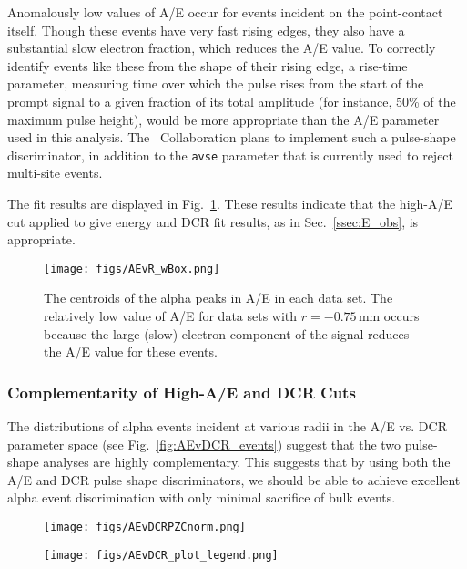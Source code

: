 \documentclass[groupedaddress,rmp,amsmath,amssymb,bibnotes,altaffilletter,twocolumn]{revtex4-1}
\begin{document}
Anomalously low values of A/E occur for events incident on the point-contact itself. Though these events have very fast rising edges, they also have a substantial slow electron fraction, which reduces the A/E value. To correctly identify events like these from the shape of their rising edge, a rise-time parameter, measuring time over which the pulse rises from the start of the prompt signal to a given fraction of its total amplitude (for instance, 50\% of the maximum pulse height), would be more appropriate than the A/E parameter used in this analysis. The \MJ\ Collaboration plans to implement such a pulse-shape discriminator, in addition to the {\tt avse} parameter that is currently used to reject multi-site events.

The fit results are displayed in Fig.~\ref{fig:AEfit_mu}. These results indicate that the high-A/E cut applied to give energy and DCR fit results,  as in Sec.~\ref{ssec:E_obs}, is appropriate.

\begin{figure}[]
 \centering
 \texttt{[image: figs/AEvR\_wBox.png]}
 \caption{The centroids of the alpha peaks in A/E in each data set. The relatively low value of A/E for data sets with $r=-0.75$\,mm occurs because the large (slow) electron component of the signal reduces the A/E value for these events.} 
 \label{fig:AEfit_mu}
\end{figure}

\subsubsection{Complementarity of High-A/E and DCR Cuts}
The distributions of alpha events incident at various radii in the A/E vs. DCR parameter space (see Fig.~\ref{fig:AEvDCR_events}) suggest that the two pulse-shape analyses are highly complementary. This suggests that by using both the A/E and DCR pulse shape discriminators, we should be able to achieve excellent alpha event discrimination with only minimal sacrifice of bulk events. 

\begin{figure*}[]
 \centering
 \begin{subfigure}{.65\textwidth}
 \texttt{[image: figs/AEvDCRPZCnorm.png]}
 \end{subfigure}
 \begin{subfigure}{.34\textwidth}
  \texttt{[image: figs/AEvDCR\_plot\_legend.png]}
   \end{subfigure}
 \caption{The A/E vs. normalized DCR distribution for all single-site events with energies between 100\,keV and 10\,MeV, at varying scanning radii. The points in black are from a data set without the alpha source incident on the detector surface, and the scan data sets are shown in rainbow order, with red representing the smallest-radius scan. 99\% of calibration events with energies between 1000 and 2630\,keV fall below an A/E value of 1, and 99\% of calibration events with energies between 1000 and 2380\,keV fall below a {\tt dcrpzc99norm} value of 1.} 
 \label{fig:AEvDCR_events}
\end{figure*}
\end{document}
